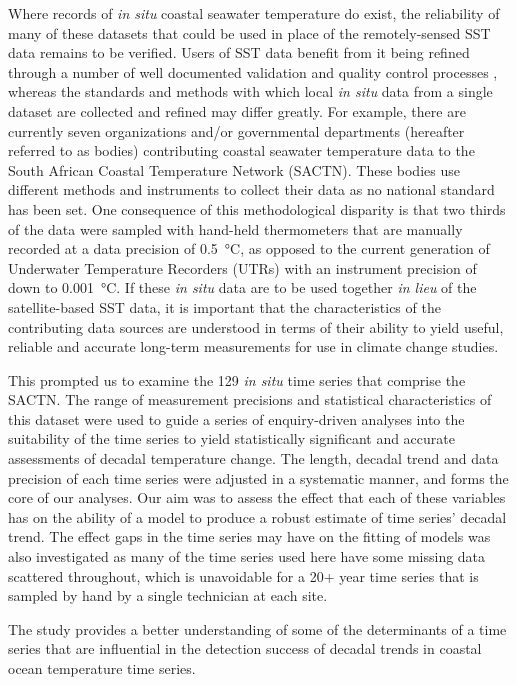 \documentclass[]{ametsoc}
\begin{document}
Where records of \emph{in situ} coastal seawater temperature do exist, the reliability of many of these datasets that could be used in place of the remotely-sensed SST data remains to be verified. Users of SST data benefit from it being refined through a number of well documented validation and quality control processes \citep[e.g.][]{Reynolds1994, Brown1999, Martin2012}, whereas the standards and methods with which local \emph{in situ} data from a single dataset are collected and refined may differ greatly. For example, there are currently seven organizations and/or governmental departments (hereafter referred to as bodies) contributing coastal seawater temperature data to the South African Coastal Temperature Network (SACTN). These bodies use different methods and instruments to collect their data as no national standard has been set. One consequence of this methodological disparity is that two thirds of the data were sampled with hand-held thermometers that are manually recorded at a data precision of \SI{0.5}{\degreeCelsius}, as opposed to the current generation of Underwater Temperature Recorders (UTRs) with an instrument precision of down to \SI{0.001}{\degreeCelsius}. If these \emph{in situ} data are to be used together \emph{in lieu} of the satellite-based SST data, it is important that the characteristics of the contributing data sources are understood in terms of their ability to yield useful, reliable and accurate long-term measurements for use in climate change studies.

This prompted us to examine the 129 \emph{in situ} time series that comprise the SACTN. The range of measurement precisions and statistical characteristics of this dataset were used to guide a series of enquiry-driven analyses into the suitability of the time series to yield statistically significant and accurate assessments of decadal temperature change. The length, decadal trend and data precision of each time series were adjusted in a systematic manner, and forms the core of our analyses. Our aim was to assess the effect that each of these variables has on the ability of a model to produce a robust estimate of time series' decadal trend. The effect gaps in the time series may have on the fitting of models was also investigated as many of the time series used here have some missing data scattered throughout, which is unavoidable for a 20+ year time series that is sampled by hand by a single technician at each site.

The study provides a better understanding of some of the determinants of a time series that are influential in the detection success of decadal trends in coastal ocean temperature time series.
\end{document}
